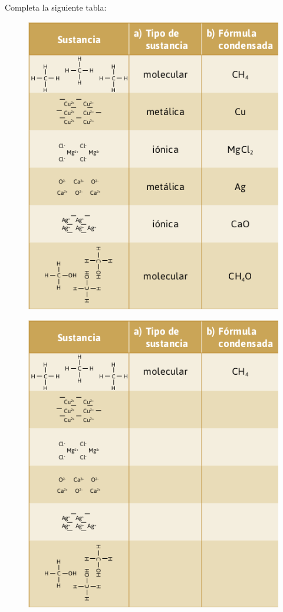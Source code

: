 \question[5] Completa la siguiente tabla:

\ifprintanswers
    \begin{figure}[H]
        \centering
        \includegraphics[width=0.6\linewidth]{../images/sustancia}
    \end{figure}
\else
    \begin{figure}[H]
        \centering
        \includegraphics[width=0.6\linewidth]{../images/sustancia_sol}
    \end{figure}
\fi
